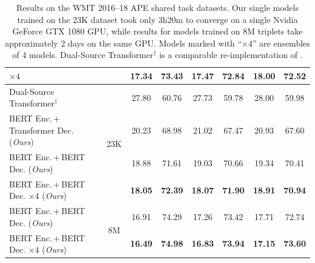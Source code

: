 \begin{landscape}
\begin{table}[t]
\begin{tabular}{lccccccc}
      \citet{junczys2018ms}$\times 4$                  &
      \multicolumn{1}{c}{}                             &
      17.34                                            & 73.43          & 17.47                         & 72.84          & 18.00 & 72.52 \\
      \midrule
      \midrule
      Dual-Source Transformer$^\dagger$                &
      \multicolumn{1}{c}{\multirow{4}{*}{23K}}         &
      27.80                                            & 60.76          & 27.73                         & 59.78          & 28.00 & 59.98 \\
      BERT Enc.\,+\,Transformer Dec. (\emph{Ours})     &
      \multicolumn{1}{c}{}                             &
      20.23                                            & 68.98          & 21.02                         & 67.47          & 20.93 & 67.60 \\
      BERT Enc.\,+\,BERT Dec. (\emph{Ours})            &
      \multicolumn{1}{c}{}                             &
      18.88                                            & 71.61          & 19.03                         & 70.66          & 19.34 & 70.41 \\
      BERT Enc.\,+\,BERT Dec. $\times 4$ (\emph{Ours}) &
      \multicolumn{1}{c}{}                             &
      \textbf{18.05}                                   & \textbf{72.39} & \textbf{18.07}                &
      \textbf{71.90}                                   & \textbf{18.91} & \textbf{70.94}                                                 \\
      \midrule
      BERT Enc.\,+\,BERT Dec. (\emph{Ours})            &
      \multicolumn{1}{c}{\multirow{2}{*}{8M}}          &
      16.91                                            & 74.29          & 17.26                         & 73.42          & 17.71 & 72.74 \\
      BERT Enc.\,+\,BERT Dec. $\times 4$ (\emph{Ours}) &
      \multicolumn{1}{c}{}                             &
      \textbf{16.49}                                   & \textbf{74.98} & \textbf{16.83}                &
      \textbf{73.94}                                   & \textbf{17.15} & \textbf{73.60}                                                 \\
      \bottomrule
    \end{tabular}
    \caption{Results on the WMT 2016--18 APE shared task datasets. Our
      single models trained on the 23K dataset took only 3h20m to converge
      on a single Nvidia GeForce GTX 1080 GPU, while results for models
      trained on 8M triplets take approximately 2 days on the same GPU.
      Models marked with ``$\times 4$'' are ensembles of 4 models.
      Dual-Source Transformer$^\dagger$ is a comparable re-implementation
      of \citet{junczys2018ms}.}
    \label{tab:results_smt}
  \end{table}
\end{landscape}

